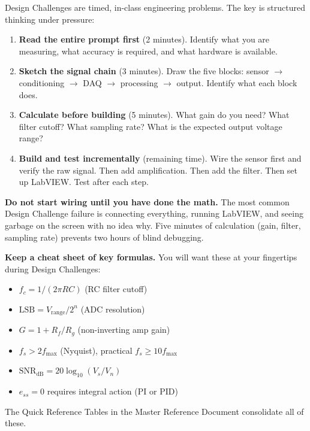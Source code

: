 \documentclass[11pt,letterpaper]{article}
\begin{document}
\begin{faqbox}
Design Challenges are timed, in-class engineering problems. The key is structured thinking under pressure:
\begin{enumerate}[leftmargin=*, itemsep=2pt, topsep=0pt]
    \item \textbf{Read the entire prompt first} (2 minutes). Identify what you are measuring, what accuracy is required, and what hardware is available.
    \item \textbf{Sketch the signal chain} (3 minutes). Draw the five blocks: sensor $\to$ conditioning $\to$ DAQ $\to$ processing $\to$ output. Identify what each block does.
    \item \textbf{Calculate before building} (5 minutes). What gain do you need? What filter cutoff? What sampling rate? What is the expected output voltage range?
    \item \textbf{Build and test incrementally} (remaining time). Wire the sensor first and verify the raw signal. Then add amplification. Then add the filter. Then set up LabVIEW. Test after each step.
\end{enumerate}
\end{faqbox}

\begin{warnbox}
\textbf{Do not start wiring until you have done the math.} The most common Design Challenge failure is connecting everything, running LabVIEW, and seeing garbage on the screen with no idea why. Five minutes of calculation (gain, filter, sampling rate) prevents two hours of blind debugging.
\end{warnbox}

\begin{protip}
\textbf{Keep a cheat sheet of key formulas.} You will want these at your fingertips during Design Challenges:
\begin{itemize}[nosep,leftmargin=*]
\item $f_c = 1/(2\pi RC)$ (RC filter cutoff)
\item $\text{LSB} = V_{\text{range}}/2^n$ (ADC resolution)
\item $G = 1 + R_f/R_g$ (non-inverting amp gain)
\item $f_s > 2 f_{\max}$ (Nyquist), practical $f_s \geq 10 f_{\max}$
\item $\text{SNR}_{\text{dB}} = 20\log_{10}(V_s/V_n)$
\item $e_{ss} = 0$ requires integral action (PI or PID)
\end{itemize}
The Quick Reference Tables in the Master Reference Document consolidate all of these.
\end{protip}
\end{document}
